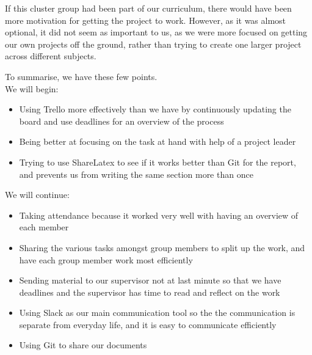 If this cluster group had been part of our curriculum, there would have been more motivation for getting the project to work.
However, as it was almost optional, it did not seem as important to us, as we were more focused on getting our own projects off the ground, rather than trying to create one larger project across different subjects.
\vspace{12pt}

\noindent To summarise, we have these few points.\\
We will begin:
\begin{itemize}
\item Using Trello more effectively than we have by continuously updating the board and use deadlines for an overview of the process
\item Being better at focusing on the task at hand with help of a project leader
\item Trying to use ShareLatex to see if it works better than Git for the report, and prevents us from writing the same section more than once
\end{itemize}

\noindent We will continue:
\begin{itemize}
\item Taking attendance because it worked very well with having an overview of each member
\item Sharing the various tasks amongst group members to split up the work, and have each group member work most efficiently
\item Sending material to our supervisor not at last minute so that we have deadlines and the supervisor has time to read and reflect on the work
\item Using Slack as our main communication tool so the the communication is separate from everyday life, and it is easy to communicate efficiently
\item Using Git to share our documents
\end{itemize}

